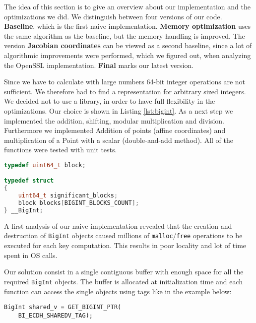 The idea of this section is to give an overview about our implementation and the optimizations we did. We distinguish between four versions of our code. \textbf{Baseline}, which is the first naive implementation. \textbf{Memory optimization} uses the same algorithm as the baseline, but the memory handling is improved. The version \textbf{Jacobian coordinates} can be viewed as a second baseline, since a lot of algorithmic improvements were performed, which we figured out, when analyzing the OpenSSL implementation. \textbf{Final} marks our latest version.

Since we have to calculate with large numbers 64-bit integer operations are not sufficient. We therefore had to find a representation for arbitrary sized integers. We decided not to use a library, in order to have full flexibility in the optimizations. Our choice is shown in Listing \ref{lst:bigint}. As a next step we implemented the addition, shifting, modular multiplication and division. Furthermore we implemented Addition of points (affine coordinates) and multiplication of a Point with a scalar (double-and-add method). All of the functions were tested with unit tests.

\begin{lstlisting}[frame=single,  captionpos=b, caption=representation of the arbitrary size integers, label=lst:bigint, language=c]
typedef uint64_t block;

typedef struct 
{
    uint64_t significant_blocks;    
    block blocks[BIGINT_BLOCKS_COUNT]; 
} __BigInt;
\end{lstlisting}


A first analysis of our naive implementation revealed that the creation and destruction of \texttt{BigInt} objects caused millions of \texttt{malloc}/\texttt{free} operations to be executed for each key computation. This results in poor locality and lot of time spent in OS calls.

Our solution consist in a single contiguous buffer with enough space for all the required \texttt{BigInt} objects. The buffer is allocated at initialization time and each function can access the single objects using tags like in the example below:

\begin{lstlisting}[frame=single, mathescape=true, captionpos=b, caption=Access by tag example]
BigInt shared_v = GET_BIGINT_PTR(
    BI_ECDH_SHAREDV_TAG);
\end{lstlisting}

